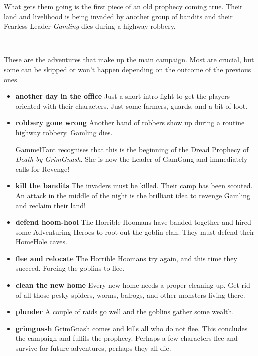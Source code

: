 What gets them going is the first piece of an old prophecy coming true. Their land and livelihood is being invaded by another group of bandits and their Fearless Leader \emph{Gamling} dies during a highway robbery.

\

\tableofcontents                           %

\vspace{4\baselineskip}


These are the adventures that make up the main campaign. Most are crucial, but some can be skipped or won't happen depending on the outcome of the previous ones.

\begin{itemize}

    \item \textbf{another day in the office} Just a short intro fight to get the players oriented with their characters. Just some farmers, guards, and a bit of loot.

    \item \textbf{robbery gone wrong} Another band of robbers show up during a routine highway robbery. Gamling dies.

    GammelTant recognises that this is the beginning of the Dread Prophecy of \emph{Death by GrimGnash}. She is now the Leader of GamGang and immediately calls for Revenge!

    \item \textbf{kill the bandits} The invaders must be killed. Their camp has been scouted. An attack in the middle of the night is the brilliant idea to revenge Gamling and reclaim their land!

    \item \textbf{defend hoom-hool} The Horrible Hoomans have banded together and hired some Adventuring Heroes to root out the goblin clan. They must defend their HomeHole caves.

    \item \textbf{flee and relocate} The Horrible Hoomans try again, and this time they succeed. Forcing the goblins to flee.

    \item \textbf{clean the new home} Every new home needs a proper cleaning up. Get rid of all those pesky spiders, worms, balrogs, and other monsters living there.

    \item \textbf{plunder} A couple of raids go well and the goblins gather some wealth.

    \item \textbf{grimgnash} GrimGnash comes and kills all who do not flee. This concludes the campaign and fulfils the prophecy. Perhaps a few characters flee and survive for future adventures, perhaps they all die.

\end{itemize}

